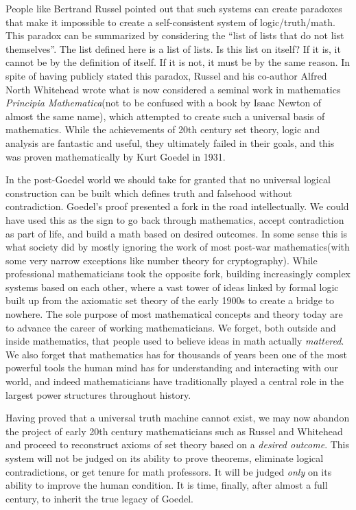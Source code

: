 \documentclass[12pt,a4paper]{amsart}
\numberwithin{equation}{section}
\begin{document}
People like Bertrand Russel pointed out that such systems can create
paradoxes that make it impossible to create a self-consistent system of
logic/truth/math. This paradox can be summarized by considering the
``list of lists that do not list themselves''. The list defined here is
a list of lists. Is this list on itself? If it is, it cannot be by the
definition of itself. If it is not, it must be by the same reason. In
spite of having publicly stated this paradox, Russel and his co-author
Alfred North Whitehead wrote what is now considered a seminal work in
mathematics \emph{Principia Mathematica}(not to be confused with a book
by Isaac Newton of almost the same name), which attempted to create such
a universal basis of mathematics. While the achievements of 20th century
set theory, logic and analysis are fantastic and useful, they ultimately
failed in their goals, and this was proven mathematically by Kurt Goedel
in 1931.

In the post-Goedel world we should take for granted that no universal
logical construction can be built which defines truth and falsehood
without contradiction. Goedel's proof presented a fork in the road
intellectually. We could have used this as the sign to go back through
mathematics, accept contradiction as part of life, and build a math
based on desired outcomes. In some sense this is what society did by
mostly ignoring the work of most post-war mathematics(with some very
narrow exceptions like number theory for cryptography). While
professional mathematicians took the opposite fork, building
increasingly complex systems based on each other, where a vast tower of
ideas linked by formal logic built up from the axiomatic set theory of
the early 1900s to create a bridge to nowhere. The sole purpose of most
mathematical concepts and theory today are to advance the career of
working mathematicians. We forget, both outside and inside mathematics,
that people used to believe ideas in math actually \emph{mattered}. We
also forget that mathematics has for thousands of years been one of the
most powerful tools the human mind has for understanding and interacting
with our world, and indeed mathematicians have traditionally played a
central role in the largest power structures throughout history.

Having proved that a universal truth machine cannot exist, we may now
abandon the project of early 20th century mathematicians such as Russel
and Whitehead and proceed to reconstruct axioms of set theory based on a
\emph{desired outcome}. This system will not be judged on its ability to
prove theorems, eliminate logical contradictions, or get tenure for math
professors. It will be judged \emph{only} on its ability to improve the
human condition. It is time, finally, after almost a full century, to
inherit the true legacy of Goedel.
\end{document}
